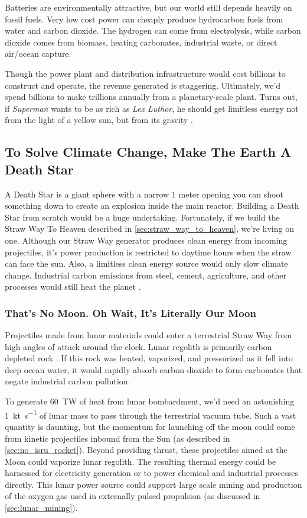 \documentclass{article}
\begin{document}
Batteries are environmentally attractive, but our world still depends heavily on fossil fuels.  Very low cost power can cheaply produce hydrocarbon fuels from water and carbon dioxide.  The hydrogen can come from electrolysis, while carbon dioxide comes from biomass, heating carbonates, industrial waste, or direct air/ocean capture.

Though the power plant and distribution infrastructure would cost billions to construct and operate, the revenue generated is staggering. Ultimately, we'd spend billions to make trillions annually from a planetary-scale plant.  Turns out, if  \textit{Superman} wants to be as rich as \textit{Lex Luthor}, he should get limitless energy not from the light of a yellow sun, but from its gravity \cite{superman2025}.

\subsection{To Solve Climate Change, Make The Earth A Death Star}\label{sec:death_star}
A Death Star \cite{death_star} is a giant sphere with a  narrow 1 meter opening you can shoot something down to create an explosion inside the main reactor.   Building a Death Star from scratch  would be a huge undertaking.   Fortunately, if we build the Straw Way To Heaven described in \autoref{sec:straw_way_to_heaven}, we're living on one.  Although our Straw Way generator produces clean energy from incoming projectiles, it's power production is restricted to daytime hours when the straw can face the sun.   Also, a limitless clean energy source would only slow climate change.   Industrial carbon emissions from steel, cement, agriculture, and other processes would still heat the planet \cite{steel_and_cement}.   

\subsubsection{That's No Moon.  Oh Wait, It's Literally Our Moon}\cite{starwars1977}
Projectiles made from lunar materials could enter a terrestrial Straw Way from high angles of attack around the clock.  Lunar regolith is primarily carbon depleted rock \cite{mckay1991lunar}.  If this rock was heated, vaporized, and pressurized as it fell into deep ocean water, it would rapidly absorb carbon dioxide to form carbonates that  negate industrial carbon pollution.

To generate \SI{60}{\tera\watt} of heat from lunar bombardment, we'd need an astonishing \SI{1}{\kilo\tonne\per\second} of lunar mass to pass through the terrestrial vacuum tube. Such a vast quantity is daunting, but the momentum for launching off the moon could come from kinetic projectiles inbound from the Sun (as described in \autoref{sec:no_isru_rocket}). Beyond providing thrust, these projectiles aimed at the Moon could vaporize lunar regolith. The resulting thermal energy could be harnessed for electricity generation or to power chemical and industrial processes directly. This lunar power source could support large scale mining and production of the oxygen gas used in externally pulsed propulsion  (as discussed in \autoref{sec:lunar_mining}).
\end{document}
